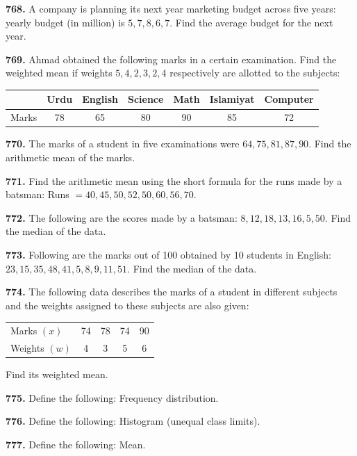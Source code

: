 \documentclass[11pt]{article}
\begin{document}
\bigskip
\noindent\textbf{768.} A company is planning its next year marketing budget across five years: yearly budget (in million) is $5,7,8,6,7$. Find the average budget for the next year.

\bigskip
\noindent\textbf{769.} Ahmad obtained the following marks in a certain examination. Find the weighted mean if weights $5,4,2,3,2,4$ respectively are allotted to the subjects:
\begin{center}
\begin{tabular}{lcccccc}
\toprule
& Urdu & English & Science & Math & Islamiyat & Computer \\
\midrule
Marks & 78 & 65 & 80 & 90 & 85 & 72 \\
\bottomrule
\end{tabular}
\end{center}

\bigskip
\noindent\textbf{770.} The marks of a student in five examinations were $64,75,81,87,90$. Find the arithmetic mean of the marks.

\bigskip
\noindent\textbf{771.} Find the arithmetic mean using the short formula for the runs made by a batsman: Runs $=40,45,50,52,50,60,56,70$.

\bigskip
\noindent\textbf{772.} The following are the scores made by a batsman: $8,12,18,13,16,5,50$. Find the median of the data.

\bigskip
\noindent\textbf{773.} Following are the marks out of 100 obtained by 10 students in English: $23,15,35,48,41,5,8,9,11,51$. Find the median of the data.

\bigskip
\noindent\textbf{774.} The following data describes the marks of a student in different subjects and the weights assigned to these subjects are also given:
\begin{center}
\begin{tabular}{lcccc}
\toprule
Marks $(x)$ & 74 & 78 & 74 & 90 \\
Weights $(w)$ & 4 & 3 & 5 & 6 \\
\bottomrule
\end{tabular}
\end{center}
Find its weighted mean.

\bigskip
\noindent\textbf{775.} Define the following: Frequency distribution.

\bigskip
\noindent\textbf{776.} Define the following: Histogram (unequal class limits).

\bigskip
\noindent\textbf{777.} Define the following: Mean.
\end{document}
